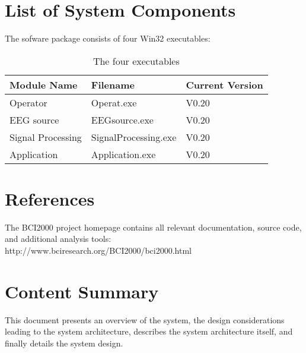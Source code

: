 \section{List of System Components}

The sofware package consists of four Win32 executables:

\begin{table}[ht]
 \centering
 \begin{tabular}{|l|l|l|}
  \hline
  \textbf{Module Name} & \textbf{Filename} & \textbf{Current Version} \\
  \hline
  Operator & Operat.exe & V0.20 \\
  \hline
  EEG source & EEGsource.exe & V0.20 \\
  \hline
  Signal Processing & SignalProcessing.exe & V0.20 \\
  \hline
  Application & Application.exe & V0.20 \\
  \hline
 \end{tabular}
 \caption{The four executables}
\end{table}   


\section{References}

The BCI2000 project homepage contains all relevant documentation, source code, 
and additional analysis tools:\\ 
http://www.bciresearch.org/BCI2000/bci2000.html

\section{Content Summary}

This document presents an overview of the system, the design considerations 
leading to the system architecture, describes the system architecture itself, 
and finally details the system design.
